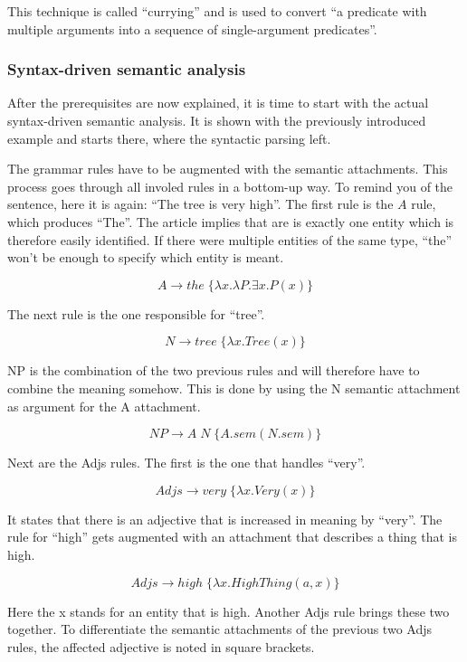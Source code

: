 \documentclass[12pt,twoside]{scrartcl}
\theoremstyle{plain}
\theoremstyle{definition}
\theoremstyle{remark}
\begin{document}
		This technique is called ``currying''\cite[p.~594]{Jurafsky2009a} and is used to convert ``a predicate with multiple arguments into a sequence of single-argument predicates''\cite[p.~594]{Jurafsky2009a}.
		
		\subsubsection*{Syntax-driven semantic analysis}
		\label{subSubSec:syntaxDrivenSemanticAnalysis}
		
		After the prerequisites are now explained, it is time to start with the actual syntax-driven semantic analysis. It is shown with the previously introduced example and starts there, where the syntactic parsing left.
		
		The grammar rules have to be augmented with the semantic attachments. This process goes through all involed rules in a bottom-up way. To remind you of the sentence, here it is again: ``The tree is very high''. The first rule is the $A$ rule, which produces ``The''. The article implies that are is exactly one entity which is therefore easily identified. If there were multiple entities of the same type, ``the'' won't be enough to specify which entity is meant.
		
		\[
			A \rightarrow the \;\{\lambda x.\lambda P.\exists x.P(x)\}
		\]
		
		The next rule is the one responsible for ``tree''.
		
		\[
			N \rightarrow tree \;\{\lambda x.Tree(x)\}
		\]
		
		NP is the combination of the two previous rules and will therefore have to combine the meaning somehow. This is done by using the N semantic attachment as argument for the A attachment.
		
		\[
			NP \rightarrow A\;N \;\{A.sem(N.sem)\}
		\]
		
		Next are the Adjs rules. The first is the one that handles ``very''.
		
		\[
			Adjs \rightarrow very \;\{\lambda x.Very(x)\}
		\]
		
		It states that there is an adjective that is increased in meaning by ``very''. The rule for ``high'' gets augmented with an attachment that describes a thing that is high.
		
		\[
			Adjs \rightarrow high \;\{\lambda x.HighThing(a, x)\}
		\]
		
		Here the x stands for an entity that is high. Another Adjs rule brings these two together. To differentiate the semantic attachments of the previous two Adjs rules, the affected adjective is noted in square brackets.
		
\end{document}
